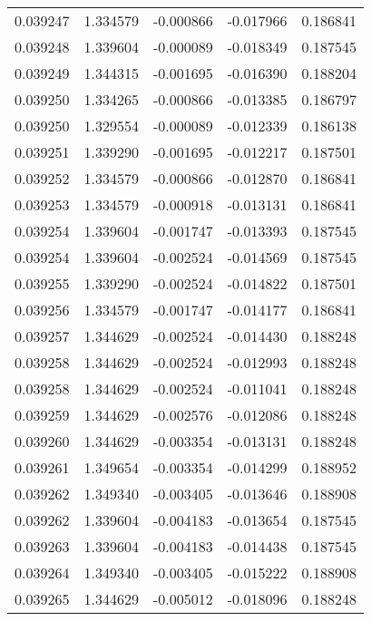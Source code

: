 \begin{tabular}{lrrrr}
0.039247    &  1.334579 & -0.000866 & -0.017966 &             0.186841 \\
0.039248    &  1.339604 & -0.000089 & -0.018349 &             0.187545 \\
0.039249    &  1.344315 & -0.001695 & -0.016390 &             0.188204 \\
0.039250    &  1.334265 & -0.000866 & -0.013385 &             0.186797 \\
0.039250    &  1.329554 & -0.000089 & -0.012339 &             0.186138 \\
0.039251    &  1.339290 & -0.001695 & -0.012217 &             0.187501 \\
0.039252    &  1.334579 & -0.000866 & -0.012870 &             0.186841 \\
0.039253    &  1.334579 & -0.000918 & -0.013131 &             0.186841 \\
0.039254    &  1.339604 & -0.001747 & -0.013393 &             0.187545 \\
0.039254    &  1.339604 & -0.002524 & -0.014569 &             0.187545 \\
0.039255    &  1.339290 & -0.002524 & -0.014822 &             0.187501 \\
0.039256    &  1.334579 & -0.001747 & -0.014177 &             0.186841 \\
0.039257    &  1.344629 & -0.002524 & -0.014430 &             0.188248 \\
0.039258    &  1.344629 & -0.002524 & -0.012993 &             0.188248 \\
0.039258    &  1.344629 & -0.002524 & -0.011041 &             0.188248 \\
0.039259    &  1.344629 & -0.002576 & -0.012086 &             0.188248 \\
0.039260    &  1.344629 & -0.003354 & -0.013131 &             0.188248 \\
0.039261    &  1.349654 & -0.003354 & -0.014299 &             0.188952 \\
0.039262    &  1.349340 & -0.003405 & -0.013646 &             0.188908 \\
0.039262    &  1.339604 & -0.004183 & -0.013654 &             0.187545 \\
0.039263    &  1.339604 & -0.004183 & -0.014438 &             0.187545 \\
0.039264    &  1.349340 & -0.003405 & -0.015222 &             0.188908 \\
0.039265    &  1.344629 & -0.005012 & -0.018096 &             0.188248 \\

\end{tabular}
